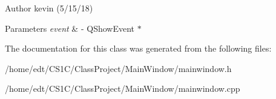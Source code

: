 \begin{DoxyAuthor}{Author}
kevin (5/15/18)
\end{DoxyAuthor}

\begin{DoxyParams}{Parameters}
{\em event} & -\/ Q\-Show\-Event $\ast$ \\
\hline
\end{DoxyParams}


The documentation for this class was generated from the following files\-:\begin{DoxyCompactItemize}
\item 
/home/edt/\-C\-S1\-C/\-Class\-Project/\-Main\-Window/mainwindow.\-h\item 
/home/edt/\-C\-S1\-C/\-Class\-Project/\-Main\-Window/mainwindow.\-cpp\end{DoxyCompactItemize}
